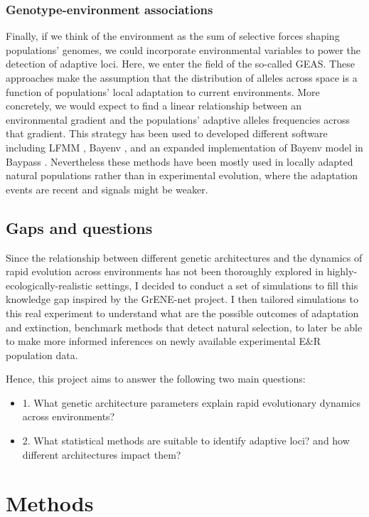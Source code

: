 \documentclass{article}
\begin{document}
\subsubsection{Genotype-environment associations}
Finally, if we think of the environment as the sum of selective forces shaping populations' genomes, we could incorporate environmental variables to power the detection of adaptive loci. Here, we enter the field of the so-called GEAS. These approaches make the assumption that the distribution of alleles across space is a function of populations' local adaptation to current environments. More concretely, we would expect to find a linear relationship between an environmental gradient and the populations' adaptive alleles frequencies across that gradient. This strategy has been used to developed different software including LFMM \citep{Frichot2013-mg}, Bayenv \citep{Gunther2013-fw}, and an expanded implementation of Bayenv model in Baypass \citep{Gautier2015-lp}. Nevertheless these methods have been mostly used in locally adapted natural populations rather than in experimental evolution, where the adaptation events are recent and signals might be weaker. 

\subsection{Gaps and questions}
    Since the relationship between different genetic architectures and the dynamics of rapid evolution across environments has not been thoroughly explored in highly-ecologically-realistic settings, I decided to conduct a set of simulations to fill this knowledge gap inspired by the GrENE-net project. I then tailored simulations to this real experiment to understand what are the possible outcomes of adaptation and extinction, benchmark methods that detect natural selection, to later be able to make more informed inferences on newly available experimental E\&R population data. 

Hence, this project aims to answer the following two main questions: 
\begin{itemize}
    \item 1. What genetic architecture parameters explain rapid evolutionary dynamics across environments? 
    \item 2. What statistical methods are suitable to identify adaptive loci? and how different architectures impact them?
\end{itemize}

\section{Methods}
\end{document}
